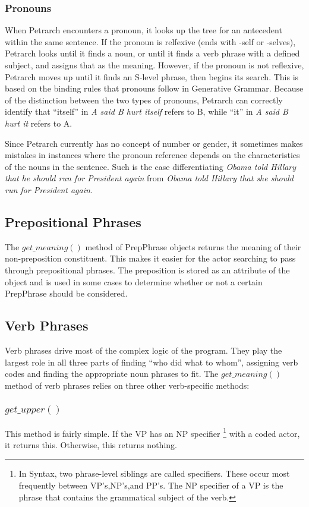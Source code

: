 \documentclass[11pt]{article}
\begin{document}
\subsubsection{Pronouns}
When Petrarch encounters a pronoun, it looks up the tree for an antecedent within the same 
sentence. If the pronoun is relfexive (ends with -self or -selves), Petrarch 
looks until it finds a noun, or until it finds a verb phrase with a defined 
subject, and assigns that as the meaning. However, if the pronoun is not 
reflexive,  Petrarch moves up until it finds an S-level phrase, then begins its 
search. This is based on the binding rules that pronouns follow in Generative Grammar. 
Because of the distinction between the two types of pronouns, Petrarch can 
correctly identify that ``itself'' in \textit{A said B hurt itself} refers to B, 
while ``it'' in \textit{A said B hurt it} refers to A. 

Since Petrarch currently has no concept of number or gender, it sometimes makes mistakes
in instances where the pronoun reference depends on the characteristics of the 
nouns in the sentence. Such is the case differentiating \textit{Obama told Hillary 
that he should run for President again} from \textit{Obama told Hillary that she should run
for President again}.

\subsection{Prepositional Phrases}
The $get\_meaning()$ method of PrepPhrase objects returns the meaning of their 
non-preposition constituent. This makes it easier for the actor searching to 
pass through prepositional phrases. The preposition is stored as an attribute of 
the object and is used in some cases to determine whether or not a certain PrepPhrase should 
be considered. 
\subsection{Verb Phrases}
Verb phrases drive most of the complex logic of the program. They play the 
largest role in all three parts of finding ``who did what to whom'', assigning verb 
codes and finding the appropriate noun phrases to fit. The $get\_meaning()$ 
method of verb phrases relies on three other verb-specific methods:
\subsubsection{$get\_upper()$}
This method is fairly simple. If the VP has an NP specifier \footnote{In Syntax, two phrase-level 
siblings are called specifiers. These occur most frequently between VP's,NP's,and PP's. The NP specifier 
of a VP is the phrase that contains the grammatical subject of the verb.} with a coded 
actor, it returns this. Otherwise, this returns nothing. 
\end{document}
